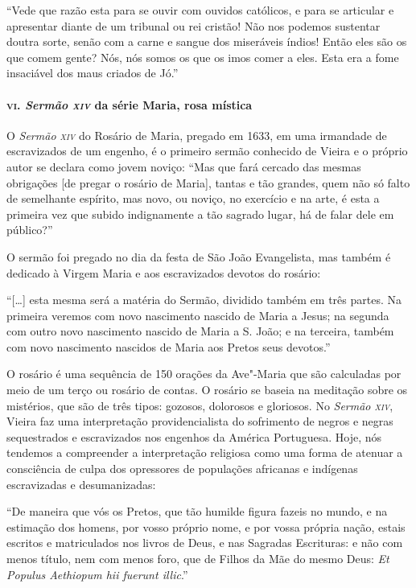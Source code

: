 ``Vede que razão esta para se ouvir com ouvidos católicos, e para se
articular e apresentar diante de um tribunal ou rei cristão! Não nos
podemos sustentar doutra sorte, senão com a carne e sangue dos
miseráveis índios! Então eles são os que comem gente? Nós, nós somos os
que os imos comer a eles. Esta era a fome insaciável dos maus criados de
Jó.''

\paragraph{\textsc{vi}. \emph{Sermão \textsc{xiv}} da série Maria, rosa mística}

O \emph{Sermão \textsc{xiv}} do Rosário de Maria, pregado em 1633, em uma
irmandade de escravizados de um engenho, é o primeiro sermão conhecido
de Vieira e o próprio autor se declara como jovem noviço: ``Mas que fará
cercado das mesmas obrigações {[}de pregar o rosário de Maria{]}, tantas
e tão grandes, quem não só falto de semelhante espírito, mas novo, ou
noviço, no exercício e na arte, é esta a primeira vez que subido
indignamente a tão sagrado lugar, há de falar dele em público?''

O sermão foi pregado no dia da festa de São João Evangelista, mas também
é dedicado à Virgem Maria e aos escravizados devotos do rosário:

``{[}\ldots{}{]} esta mesma será a matéria do Sermão, dividido também em três
partes. Na primeira veremos com novo nascimento nascido de Maria a
Jesus; na segunda com outro novo nascimento nascido de Maria a S. João;
e na terceira, também com novo nascimento nascidos de Maria aos Pretos
seus devotos.''

O rosário é uma sequência de 150 orações da Ave"-Maria que são calculadas
por meio de um terço ou rosário de contas. O rosário se baseia na
meditação sobre os mistérios, que são de três tipos: gozosos, dolorosos
e gloriosos. No \emph{Sermão \textsc{xiv}}, Vieira faz uma interpretação
providencialista do sofrimento de negros e negras sequestrados e
escravizados nos engenhos da América Portuguesa. Hoje, nós tendemos a
compreender a interpretação religiosa como uma forma de atenuar a
consciência de culpa dos opressores de populações africanas e indígenas
escravizadas e desumanizadas:

``De maneira que vós os Pretos, que tão humilde figura fazeis no mundo,
e na estimação dos homens, por vosso próprio nome, e por vossa própria
nação, estais escritos e matriculados nos livros de Deus, e nas Sagradas
Escrituras: e não com menos título, nem com menos foro, que de Filhos da
Mãe do mesmo Deus: \emph{Et Populus Aethiopum hii fuerunt illic}.''

